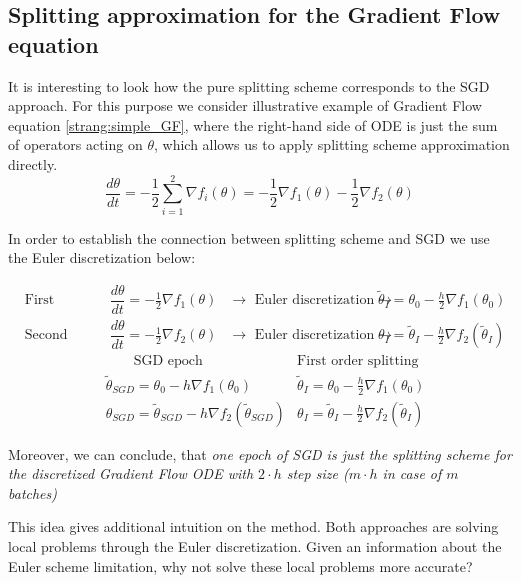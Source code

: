 \documentclass{article} %
\begin{document}
\subsection{Splitting approximation for the Gradient Flow equation}

It is interesting to look how the pure splitting scheme corresponds to the SGD approach. For this purpose we consider illustrative example of Gradient Flow equation \ref{strang:simple_GF}, where the right-hand side of ODE is just the sum of operators acting on $\theta$, which allows us to apply splitting scheme approximation directly.
\begin{equation}
\label{strang:simple_GF}
\dfrac{d \theta}{d t} = -\dfrac{1}{2} \sum\limits_{i=1}^2 \nabla f_i (\theta) = - \dfrac{1}{2} \nabla f_1 (\theta) -\dfrac{1}{2}  \nabla f_2 (\theta)
\end{equation}

In order to establish the connection between splitting scheme and SGD we use the Euler discretization below:

\begin{align*}
&\text{First splitting step: } &\dfrac{d \theta}{d t} = -\frac{1}{2}\nabla f_1(\theta)  &\to\text{ Euler discretization}\to &\tilde{\theta}_{I} = \theta_0 - \frac{h}{2}\nabla f_1 (\theta_0) \\
&\text{Second splitting step: } &\dfrac{d \theta}{d t} = -\frac{1}{2}\nabla f_2(\theta)  &\to\text{ Euler discretization}\to &\theta_{I} = \tilde{\theta}_{I} - \frac{h}{2}\nabla f_2 (\tilde{\theta}_{I})
\end{align*}
\begin{align*}
&\qquad\text{SGD epoch} &\text{First order splitting} \\
&\tilde{\theta}_{SGD} = \theta_0 - h \nabla f_1 (\theta_0) &\tilde{\theta}_{I} = \theta_0 - \frac{h}{2}\nabla f_1 (\theta_0) \\
&\theta_{SGD} = \tilde{\theta}_{SGD} - h \nabla f_2 (\tilde{\theta}_{SGD}) &\theta_{I} = \tilde{\theta}_{I} - \frac{h}{2}\nabla f_2 (\tilde{\theta}_{I})
\end{align*}

Moreover, we can conclude, that \textit{one epoch of SGD is just the splitting scheme for the discretized Gradient Flow ODE with $2 \cdot h$ step size ($m \cdot h$ in case of $m$ batches)}

This idea gives additional intuition on the method. Both approaches are solving local problems through the Euler discretization. Given an information about the Euler scheme limitation, why not solve these local problems more accurate?
\end{document}
